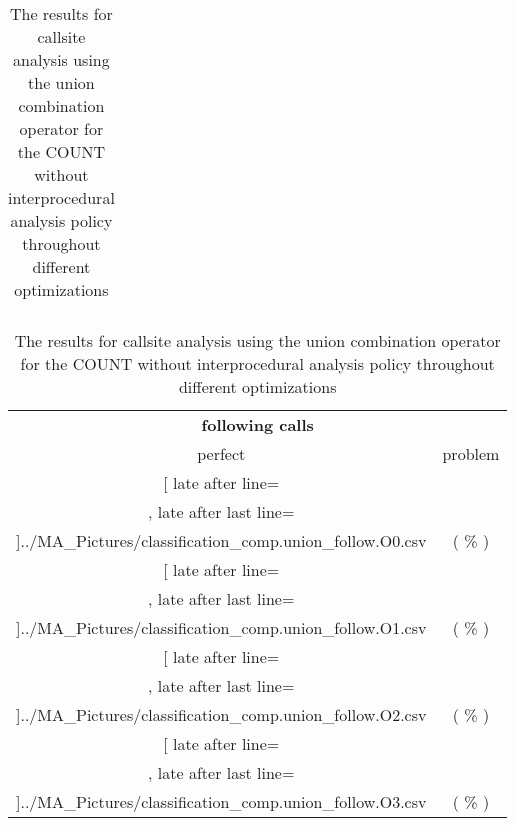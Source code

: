 \begin{table}[!htbp]
{\begin{tabular}{l|c|c|c}
    	\end{tabular}

	\begin{tabular}{|c|c}%

	\toprule
	\multicolumn{2}{c}{\bfseries  following calls}\\
	
	perfect &  problem %
	\\\midrule
	\csvreader[ late after line=\\, late after last line=\\\midrule]{../MA_Pictures/classification_comp.union_follow.O0.csv}{
}
	{\csvcoliv ( \csvcolv \% ) & \csvcolvi( \csvcolvii\% )}%



\multicolumn{1}{c}{} 
	\\\midrule
	\csvreader[ late after line=\\, late after last line=\\\midrule]{../MA_Pictures/classification_comp.union_follow.O1.csv}{
}
	{\csvcoliv ( \csvcolv \% ) & \csvcolvi( \csvcolvii\% )}%
	
	
\multicolumn{1}{c}{}
	\\\midrule
	\csvreader[ late after line=\\, late after last line=\\\midrule]{../MA_Pictures/classification_comp.union_follow.O2.csv}{
}
	{\csvcoliv ( \csvcolv \% ) & \csvcolvi( \csvcolvii\% )}%
	

\multicolumn{1}{c}{}
	\\\midrule
	\csvreader[ late after line=\\, late after last line=\\\bottomrule]{../MA_Pictures/classification_comp.union_follow.O3.csv}{
}
	{\csvcoliv ( \csvcolv \% ) & \csvcolvi( \csvcolvii\% )}%


    	\end{tabular}
}
		\caption {The results for callsite analysis using the union combination operator for the COUNT without interprocedural analysis policy throughout different optimizations}
		\label{tbl:CSunionCOUNTnointer}
\end{table}
